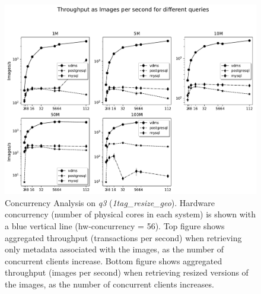 \begin{figure}[ht]
\includegraphics[width=\textwidth]{figures/plot_conc_1tag_loc20_resize_mosaic_results_throughput_db_size}
\caption{Concurrency Analysis on \textit{q3} (\textit{1tag\_resize\_geo}).
Hardware concurrency (number of physical cores in each system)
is shown with a blue vertical line (hw-concurrency = 56).
Top figure shows aggregated throughput (transactions per second)
when retrieving only metadata associated with the images, as the number of
concurrent clients increase.
Bottom figure shows aggregated throughput (images per second) when retrieving
resized versions of the images, as the number of concurrent clients increases.}
\label{fig:concurrency_comparison}
\end{figure}

